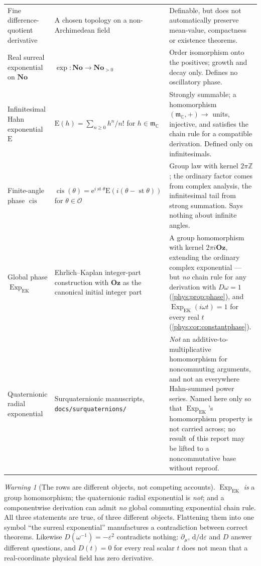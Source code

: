 \documentclass[11pt,letterpaper]{article}
\numberwithin{equation}{section}
\theoremstyle{definition}
\theoremstyle{remark}
\newtheorem{warning}[theorem]{Warning}
\newcommand{\No}{\mathbf{No}}
\newcommand{\C}{\mathbb C}
\newcommand{\Z}{\mathbb Z}
\newcommand{\eps}{\varepsilon}
\newcommand{\Ofin}{\mathcal O}
\newcommand{\mm}{\mathfrak m}
\DeclareMathOperator{\st}{st}
\DeclareMathOperator{\cis}{cis}
\newcommand{\Oz}{\mathbf{Oz}}
\newcommand{\dd}{\mathrm d}
\newcommand{\ee}{\mathrm e}
\newcommand{\ExpEK}{\operatorname{Exp}_{\mathrm{EK}}}
\newcommand{\Emm}{\mathrm{E}}
\begin{document}
\begin{longtable}{@{}L{0.20\textwidth}L{0.31\textwidth}L{0.41\textwidth}@{}}
\addlinespace
Fine difference-quotient derivative &
A chosen topology on a non-Archimedean field &
Definable, but does not automatically preserve mean-value, compactness or
existence theorems. \\
\addlinespace
Real surreal exponential on $\No$ &
$\exp:\No\to\No_{>0}$ \cite{phys:vdDE} &
Order isomorphism onto the positives; growth and decay only. Defines no
oscillatory phase. \\
\addlinespace
Infinitesimal Hahn exponential $\Emm$ &
$\Emm(h)=\sum_{n\ge0}h^{n}/n!$ for $h\in\mm_{\C}$ &
Strongly summable; a homomorphism $(\mm_{\C},+)\to$ units, injective, and
satisfies the chain rule for a compatible derivation. Defined only on
infinitesimals. \\
\addlinespace
Finite-angle phase $\cis$ &
$\cis(\theta)=\ee^{i\st\theta}\Emm(i(\theta-\st\theta))$ for
$\theta\in\Ofin$ &
Group law with kernel $2\pi\Z$; the ordinary factor comes from complex
analysis, the infinitesimal tail from strong summation. Says nothing about
infinite angles. \\
\addlinespace
Global phase $\ExpEK$ &
Ehrlich--Kaplan integer-part construction with $\Oz$ as the canonical initial
integer part \cite{phys:EK} &
A group homomorphism with kernel $2\pi i\Oz$, extending the ordinary complex
exponential --- but \emph{no} chain rule for any derivation with $D\omega=1$
(\cref{phys:prop:phase}), and $\ExpEK(i\omega t)=1$ for every real $t$
(\cref{phys:cor:constantphase}). \\
\addlinespace
Quaternionic radial exponential &
Surquaternionic manuscripts, \texttt{docs/surquaternions/} &
\emph{Not} an additive-to-multiplicative homomorphism for noncommuting
arguments, and not an everywhere Hahn-summed power series. Named here only so
that $\ExpEK$'s homomorphism property is not carried across; no result of this
report may be lifted to a noncommutative base without reproof. \\
\end{longtable}

\begin{warning}[The rows are different objects, not competing accounts]
\label{phys:warn:ledger}
$\ExpEK$ \emph{is} a group homomorphism; the quaternionic radial exponential is
\emph{not}; and a componentwise derivation can admit \emph{no} global
commuting exponential chain rule. All three statements are true, of three
different objects. Flattening them into one symbol ``the surreal exponential''
manufactures a contradiction between correct theorems. Likewise
$D(\omega^{-1})=-\eps^{2}$ contradicts nothing: $\partial_{\mu}$, $\dd/\dd\eps$
and $D$ answer different questions, and $D(t)=0$ for every real scalar $t$
does not mean that a real-coordinate physical field has zero derivative.
\end{warning}
\end{document}
